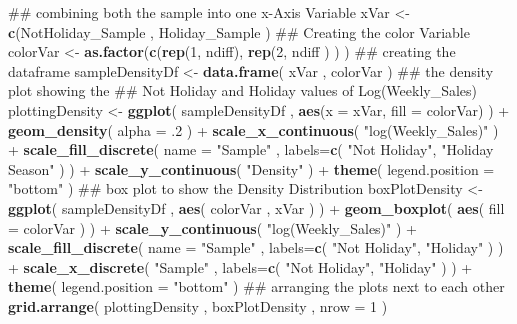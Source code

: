 \documentclass[]{article}
\newenvironment{Shaded}{\begin{snugshade}}{\end{snugshade}}
\newcommand{\KeywordTok}[1]{\textcolor[rgb]{0.13,0.29,0.53}{\textbf{{#1}}}}
\newcommand{\DataTypeTok}[1]{\textcolor[rgb]{0.13,0.29,0.53}{{#1}}}
\newcommand{\DecValTok}[1]{\textcolor[rgb]{0.00,0.00,0.81}{{#1}}}
\newcommand{\StringTok}[1]{\textcolor[rgb]{0.31,0.60,0.02}{{#1}}}
\newcommand{\NormalTok}[1]{{#1}}
\begin{document}
\begin{Shaded}
\begin{Highlighting}[]
\NormalTok{## combining both the sample into one x-Axis Variable}
\NormalTok{xVar <-}\StringTok{ }\KeywordTok{c}\NormalTok{(NotHoliday_Sample , Holiday_Sample )}
\NormalTok{## Creating the color Variable}
\NormalTok{colorVar <-}\StringTok{ }\KeywordTok{as.factor}\NormalTok{(}\KeywordTok{c}\NormalTok{(}\KeywordTok{rep}\NormalTok{(}\DecValTok{1}\NormalTok{, ndiff), }\KeywordTok{rep}\NormalTok{(}\DecValTok{2}\NormalTok{, ndiff ) ) )}
\NormalTok{## creating the dataframe}
\NormalTok{sampleDensityDf <-}\StringTok{ }\KeywordTok{data.frame}\NormalTok{( xVar ,  colorVar )}
\NormalTok{## the density plot showing the }
\NormalTok{## Not Holiday and Holiday values of Log(Weekly_Sales)}
\NormalTok{plottingDensity <-}\StringTok{ }\KeywordTok{ggplot}\NormalTok{( sampleDensityDf , }\KeywordTok{aes}\NormalTok{(}\DataTypeTok{x =} \NormalTok{xVar, }\DataTypeTok{fill =} \NormalTok{colorVar) ) +}\StringTok{ }
\StringTok{  }\KeywordTok{geom_density}\NormalTok{( }\DataTypeTok{alpha =} \NormalTok{.}\DecValTok{2} \NormalTok{) +}
\StringTok{  }\KeywordTok{scale_x_continuous}\NormalTok{( }\StringTok{"log(Weekly_Sales)"} \NormalTok{) +}
\StringTok{  }\KeywordTok{scale_fill_discrete}\NormalTok{( }
    \DataTypeTok{name =} \StringTok{"Sample"} \NormalTok{, }\DataTypeTok{labels=}\KeywordTok{c}\NormalTok{( }\StringTok{"Not Holiday"}\NormalTok{, }\StringTok{"Holiday Season"} \NormalTok{) ) +}
\StringTok{  }\KeywordTok{scale_y_continuous}\NormalTok{( }\StringTok{"Density"} \NormalTok{) +}
\StringTok{  }\KeywordTok{theme}\NormalTok{( }\DataTypeTok{legend.position =} \StringTok{"bottom"} \NormalTok{)}
\NormalTok{## box plot to show the Density Distribution}
\NormalTok{boxPlotDensity <-}\StringTok{ }\KeywordTok{ggplot}\NormalTok{( sampleDensityDf , }\KeywordTok{aes}\NormalTok{( colorVar , xVar ) ) +}\StringTok{ }
\StringTok{  }\KeywordTok{geom_boxplot}\NormalTok{( }\KeywordTok{aes}\NormalTok{( }\DataTypeTok{fill =} \NormalTok{colorVar ) ) +}\StringTok{ }
\StringTok{  }\KeywordTok{scale_y_continuous}\NormalTok{( }\StringTok{"log(Weekly_Sales)"} \NormalTok{) +}
\StringTok{  }\KeywordTok{scale_fill_discrete}\NormalTok{( }
    \DataTypeTok{name =} \StringTok{"Sample"} \NormalTok{, }\DataTypeTok{labels=}\KeywordTok{c}\NormalTok{( }\StringTok{"Not Holiday"}\NormalTok{, }\StringTok{"Holiday"} \NormalTok{) ) +}
\StringTok{  }\KeywordTok{scale_x_discrete}\NormalTok{( }\StringTok{"Sample"} \NormalTok{, }\DataTypeTok{labels=}\KeywordTok{c}\NormalTok{( }\StringTok{"Not Holiday"}\NormalTok{, }\StringTok{"Holiday"} \NormalTok{) ) +}
\StringTok{  }\KeywordTok{theme}\NormalTok{( }\DataTypeTok{legend.position =} \StringTok{"bottom"} \NormalTok{)}
\NormalTok{## arranging the plots next to each other}
\KeywordTok{grid.arrange}\NormalTok{( plottingDensity , boxPlotDensity , }\DataTypeTok{nrow =} \DecValTok{1} \NormalTok{)}
\end{Highlighting}
\end{Shaded}
\end{document}
